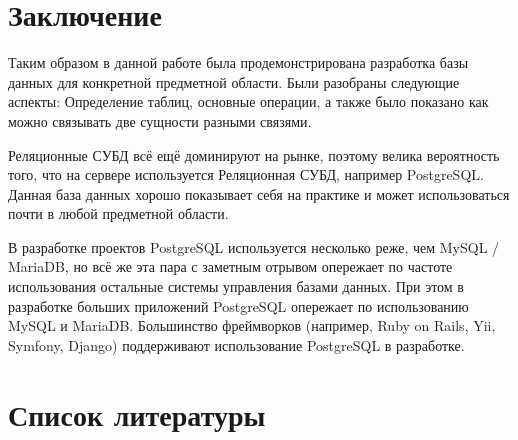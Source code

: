 \documentclass[14pt]{extarticle}
\begin{document}
    \newpage

    \section*{Заключение}

    Таким образом в данной работе была продемонстрирована разработка базы данных для конкретной предметной области. Были разобраны следующие аспекты: Определение таблиц, основные операции, а также было показано как можно связывать две сущности разными связями.

    Реляционные СУБД всё ещё доминируют на рынке, поэтому велика вероятность того, что на сервере используется Реляционная СУБД, например PostgreSQL. Данная база данных хорошо показывает себя на практике и может использоваться почти в любой предметной области.

    В разработке проектов PostgreSQL используется несколько реже, чем MySQL / MariaDB, но всё же эта пара с заметным отрывом опережает по частоте использования остальные системы управления базами данных. При этом в разработке больших приложений PostgreSQL опережает по использованию MySQL и MariaDB. Большинство фреймворков (например, Ruby on Rails, Yii, Symfony, Django) поддерживают использование PostgreSQL в разработке.

    \newpage
    \section*{Список литературы}
\end{document}
